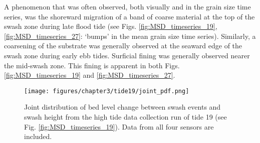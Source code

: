 A phenomenon that was often observed, both visually and in the grain size time series, was the shoreward migration of a band of coarse material at the top of the swash zone during late flood tide (see Figs. \ref{fig:MSD_timeseries_19}, \ref{fig:MSD_timeseries_27}: `bumps' in the mean grain size time series). Similarly, a coarsening of the substrate was generally observed at the seaward edge of the swash zone during early ebb tides. Surficial fining was generally observed nearer the mid-swash zone. This fining is apparent in both Figs. \ref{fig:MSD_timeseries_19} and \ref{fig:MSD_timeseries_27}. 



\begin{figure}[tbp] %
	\texttt{[image: figures/chapter3/tide19/joint\_pdf.png]}
	\caption[Joint distribution of bed level change and swash height, tide 19]{Joint distribution of bed level change between swash events and swash height from the high tide data collection run of tide 19 (see Fig. \ref{fig:MSD_timeseries_19}). Data from all four sensors are included.}
 	\label{fig:hist19}
\end{figure}

